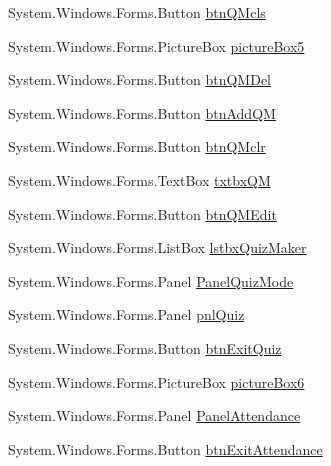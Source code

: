 \begin{DoxyCompactItemize}
\-System.\-Windows.\-Forms.\-Button \hyperlink{class_sr_p___classroom_inq_1_1frm_classrrom_inq_a5e5ac9d18be5dce770d85fe95daa6801}{btn\-Q\-Mcls}
\item 
\-System.\-Windows.\-Forms.\-Picture\-Box \hyperlink{class_sr_p___classroom_inq_1_1frm_classrrom_inq_a1b73086b2cde9f44d3e6dfe20e17efbf}{picture\-Box5}
\item 
\-System.\-Windows.\-Forms.\-Button \hyperlink{class_sr_p___classroom_inq_1_1frm_classrrom_inq_a607596e2d684359b9534981170093cce}{btn\-Q\-M\-Del}
\item 
\-System.\-Windows.\-Forms.\-Button \hyperlink{class_sr_p___classroom_inq_1_1frm_classrrom_inq_adda77c1d58e5db64040dff4228e6d97e}{btn\-Add\-Q\-M}
\item 
\-System.\-Windows.\-Forms.\-Button \hyperlink{class_sr_p___classroom_inq_1_1frm_classrrom_inq_a07b511c8a2d041cab8551a9b7b9a65de}{btn\-Q\-Mclr}
\item 
\-System.\-Windows.\-Forms.\-Text\-Box \hyperlink{class_sr_p___classroom_inq_1_1frm_classrrom_inq_a4a85095c6aa75b21689e40d7dc78ace6}{txtbx\-Q\-M}
\item 
\-System.\-Windows.\-Forms.\-Button \hyperlink{class_sr_p___classroom_inq_1_1frm_classrrom_inq_ab86f3e7a592038c27499e00ec0a7fb3b}{btn\-Q\-M\-Edit}
\item 
\-System.\-Windows.\-Forms.\-List\-Box \hyperlink{class_sr_p___classroom_inq_1_1frm_classrrom_inq_af2496f0a0579263d9def95bd23d29c89}{lstbx\-Quiz\-Maker}
\item 
\-System.\-Windows.\-Forms.\-Panel \hyperlink{class_sr_p___classroom_inq_1_1frm_classrrom_inq_a0dfa3465bc2680dd54dfeacc88b39bee}{\-Panel\-Quiz\-Mode}
\item 
\-System.\-Windows.\-Forms.\-Panel \hyperlink{class_sr_p___classroom_inq_1_1frm_classrrom_inq_a482ea3246ef232cad6430e85e54a0e3a}{pnl\-Quiz}
\item 
\-System.\-Windows.\-Forms.\-Button \hyperlink{class_sr_p___classroom_inq_1_1frm_classrrom_inq_a207f1be65a3e42071f8375603e4b854c}{btn\-Exit\-Quiz}
\item 
\-System.\-Windows.\-Forms.\-Picture\-Box \hyperlink{class_sr_p___classroom_inq_1_1frm_classrrom_inq_a1431b950ca4cfb27ea99f44116fa80da}{picture\-Box6}
\item 
\-System.\-Windows.\-Forms.\-Panel \hyperlink{class_sr_p___classroom_inq_1_1frm_classrrom_inq_a45178e53b0fdc6749e2557f299ddddac}{\-Panel\-Attendance}
\item 
\-System.\-Windows.\-Forms.\-Button \hyperlink{class_sr_p___classroom_inq_1_1frm_classrrom_inq_a93fffe4de78481ddb21200cf66e89a17}{btn\-Exit\-Attendance}

\end{DoxyCompactItemize}
